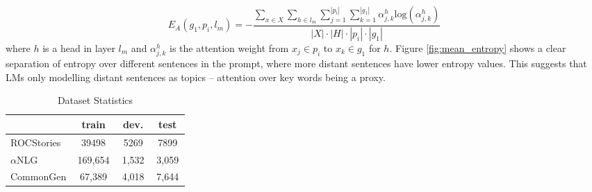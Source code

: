 \documentclass[11pt,a4paper]{article}
\begin{document}
\begin{equation}
    \label{eq:sent_sent_attn_entropy}
    E_{A}(g_1,p_i,l_m)=-\frac{
    \sum\limits_{x \in X} 
    \sum\limits_{h \in l_m} 
    \sum\limits_{j=1}^{|p_i|}
    \sum\limits_{k=1}^{|g_1|}
    \alpha^{h}_{j,k}\text{log}(\alpha^{h}_{j,k})
    }
    {
  |X|\cdot |H| \cdot|p_i|\cdot |g_1|
    }
\end{equation}
where $h$ is a head in layer $l_m$ and $\alpha^{h}_{j,k}$ is the attention weight from $x_j \in p_i$ to $x_k \in g_1$ for $h$. Figure \ref{fig:mean_entropy} shows a clear separation of entropy over different sentences in the prompt, where more distant sentences have lower entropy values. %
This suggests that LMs  only modelling  distant sentences as topics -- attention over key words being a proxy. %
\begin{table}[t]
\centering
\begin{tabular}{ p{0.3\linewidth}|ccc}
\toprule
          & \textbf{train}             & \textbf{dev.}  & \textbf{test} \\ \midrule
ROCStories &      39498   &  5269   &   7899   \\ 
$\alpha$NLG   & 169,654   & 1,532 & 3,059 \\ 
CommonGen  & 67,389  & 4,018 & 7,644 \\ \bottomrule
\end{tabular}\caption{Dataset Statistics}\label{tab:datasets}
\end{table}
\end{document}
